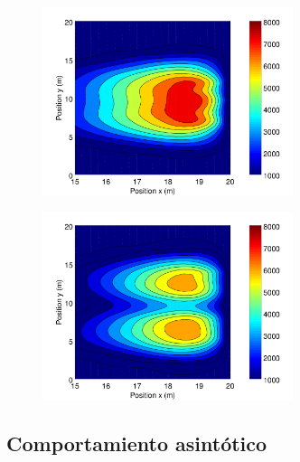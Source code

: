 \begin{figure}[H]
    \centering
    \includegraphics[height=5.5cm]{figuras/press_225p_v4_g1_5.png}
    \caption[width=5cm]{\centering\textit{}}
    \label{sintesis}
\end{figure}

\begin{figure}[H]
    \centering
    \includegraphics[height=5.5cm]{figuras/press_225p_v4_g5.png}
    \caption[width=5cm]{\centering\textit{}}
    \label{sintesis}
\end{figure}




\subsection{Comportamiento asintótico}




